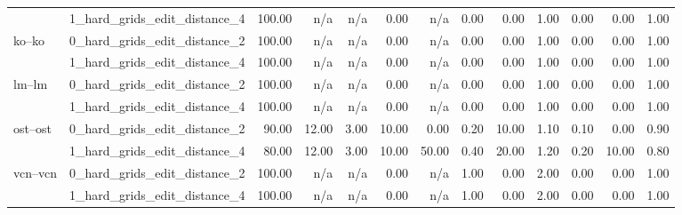 \begin{tabular}{llrrrrrrrrrrr}
 & 1_hard_grids_edit_distance_4 & 100.00 & n/a & n/a & 0.00 & n/a & 0.00 & 0.00 & 1.00 & 0.00 & 0.00 & 1.00 \\
\cline{1-13}
\multirow[t]{2}{*}{ko--ko} & 0_hard_grids_edit_distance_2 & 100.00 & n/a & n/a & 0.00 & n/a & 0.00 & 0.00 & 1.00 & 0.00 & 0.00 & 1.00 \\
 & 1_hard_grids_edit_distance_4 & 100.00 & n/a & n/a & 0.00 & n/a & 0.00 & 0.00 & 1.00 & 0.00 & 0.00 & 1.00 \\
\cline{1-13}
\multirow[t]{2}{*}{lm--lm} & 0_hard_grids_edit_distance_2 & 100.00 & n/a & n/a & 0.00 & n/a & 0.00 & 0.00 & 1.00 & 0.00 & 0.00 & 1.00 \\
 & 1_hard_grids_edit_distance_4 & 100.00 & n/a & n/a & 0.00 & n/a & 0.00 & 0.00 & 1.00 & 0.00 & 0.00 & 1.00 \\
\cline{1-13}
\multirow[t]{2}{*}{ost--ost} & 0_hard_grids_edit_distance_2 & 90.00 & 12.00 & 3.00 & 10.00 & 0.00 & 0.20 & 10.00 & 1.10 & 0.10 & 0.00 & 0.90 \\
 & 1_hard_grids_edit_distance_4 & 80.00 & 12.00 & 3.00 & 10.00 & 50.00 & 0.40 & 20.00 & 1.20 & 0.20 & 10.00 & 0.80 \\
\cline{1-13}
\multirow[t]{2}{*}{vcn--vcn} & 0_hard_grids_edit_distance_2 & 100.00 & n/a & n/a & 0.00 & n/a & 1.00 & 0.00 & 2.00 & 0.00 & 0.00 & 1.00 \\
 & 1_hard_grids_edit_distance_4 & 100.00 & n/a & n/a & 0.00 & n/a & 1.00 & 0.00 & 2.00 & 0.00 & 0.00 & 1.00 \\
\cline{1-13}
\bottomrule
\end{tabular}
